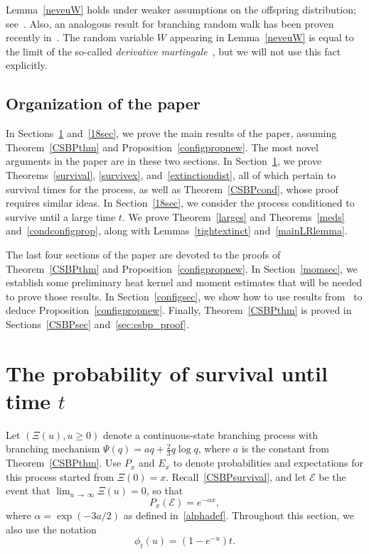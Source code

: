 \documentclass[AHL,Unicode,longabstracts,published]{cedram}
\newcommand{\clE}{\mathcal{E}}
\newcommand{\1} {\mathds{1}}
\begin{document}
\begin{rema}
Lemma~\ref{neveuW} holds under weaker assumptions on the offspring distribution; see~\cite{thesis}. Also, an analogous result for branching random walk has been proven recently in~\cite{bim20}. The random variable $W$ appearing in Lemma~\ref{neveuW} is equal to the limit of the so-called \emph{derivative martingale}~\cite{nev87}, but we will not use this fact explicitly.
\end{rema}

\subsection{Organization of the paper}\label{sec:organization}

In Sections~\ref{survivalsec} and~\ref{18sec}, we prove the main results of the paper, assuming Theorem~\ref{CSBPthm} and Proposition~\ref{configpropnew}. The most novel arguments in the paper are in these two sections. In Section~\ref{survivalsec}, we prove Theorems~\ref{survival}, \ref{survivex}, and~\ref{extinctiondist}, all of which pertain to survival times for the process, as well as Theorem~\ref{CSBPcond}, whose proof requires similar ideas. In Section~\ref{18sec}, we consider the process conditioned to survive until a large time $t$. We prove Theorem~\ref{larges} and Theorems~\ref{meds} and~\ref{condconfigprop}, along with Lemmas~\ref{tightextinct} and~\ref{mainLRlemma}.

The last four sections of the paper are devoted to the proofs of Theorem~\ref{CSBPthm} and Proposition~\ref{configpropnew}. In Section~\ref{momsec}, we establish some preliminary heat kernel and moment estimates that will be needed to prove those results. In Section~\ref{configsec}, we show how to use results from~\cite{bbs3} to deduce Proposition~\ref{configpropnew}. Finally, Theorem~\ref{CSBPthm} is proved in Sections~\ref{CSBPsec} and~\ref{sec:csbp_proof}.

\section{The probability of survival until time \texorpdfstring{$t$}{t}}\label{survivalsec}

Let $(\Xi(u), u \geq 0)$ denote a continuous-state branching process with branching mechanism $\Psi(q) = aq + \frac{2}{3} q \log q$, where $a$ is the constant from Theorem~\ref{CSBPthm}. Use $P_x$ and $E_x$ to denote probabilities and expectations for this process started from $\Xi(0) = x$. Recall~\eqref{CSBPsurvival}, and let $\clE$ be the event that $\lim_{u\,\rightarrow\,\infty} \Xi(u) = 0$, so that
\begin{equation}\label{CSBPext}
P_x(\clE) = e^{-\alpha x},
\end{equation}
where $\alpha = \exp(-3a/2)$ as defined in~\eqref{alphadef}. Throughout this section, we also use the notation
\[
\phi_t(u) = \left(1 - e^{-u}\right)t.
\]
\end{document}

